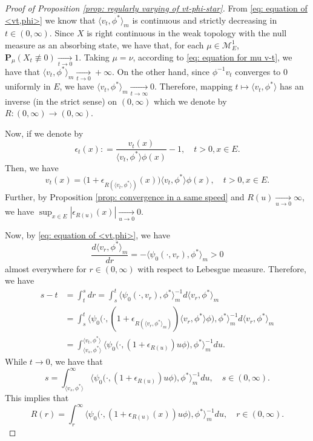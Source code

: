 \documentclass[12pt, a4paper]{amsart}
\theoremstyle{definition}
\numberwithin{equation}{section}
\begin{document}
\begin{proof}[Proof of Proposition \ref{prop: regularly varying of vt-phi-star}]
	
	From \eqref{eq: equation of <vt,phi>} we know that $\langle v_t,\phi^* \rangle_m$ is continuous and strictly decreasing in $t \in (0,\infty)$.
	Since $X$ is right continuous in the weak topology with the null measure as an absorbing state, we have that, for each $\mu \in \mathcal M_E^1$, $\mathbf P_\mu (X_t \not \equiv 0) \xrightarrow[t\to 0]{} 1$.
	Taking $\mu = \nu$, according to \eqref{eq: equation for mu v-t}, we have that $\langle v_{t}, \phi^*\rangle_m \xrightarrow[t\to 0]{} +\infty$.
	On the other hand, since $\phi^{-1}v_t$ converges to $0$ uniformly in $E$, we have $\langle v_{t}, \phi^*\rangle_m \xrightarrow[t\to \infty]{} 0$.
	Therefore, mapping $t\mapsto \langle v_t,\phi^*  \rangle$ has an inverse (in the strict sense) on $(0,\infty)$ which we denote by $R : (0,\infty) \to (0,\infty)$.
	
	Now, if we denote by
\[
	\epsilon_{t}(x)
	: = \frac{v_t(x)}{\langle v_t, \phi^*\rangle \phi(x)} - 1,
	\quad t>0, x\in E.
\]
	Then, we have
\[
	v_t(x)
	= \big(1+ \epsilon_{R(\langle v_t,\phi^* \rangle)}(x) \big )\langle v_t,\phi^* \rangle \phi(x),
	\quad t>0, x\in E.
\]
	Further, by Proposition \ref{prop: convergence in a same speed} and $R(u)\xrightarrow[u\to 0]{} \infty$, we have
$
	\sup_{x\in E}|\epsilon_{R(u)}(x)|
	\xrightarrow[u\to 0]{} 0.
$

	Now, by \eqref{eq: equation of <vt,phi>}, we have
\[
	\frac{d \langle v_r, \phi^* \rangle_m}{dr}
	= - \langle \psi_0(\cdot ,v_r) ,\phi^*\rangle_m
	> 0
\]
	almost everywhere for $r\in (0,\infty)$ with respect to Lebesgue measure.
	Therefore, we have
\[\begin{split}
	s-t
	& = \int_t^s dr
	= \int_s^t \langle \psi_0(\cdot ,v_r), \phi^*\rangle _m^{-1} d\langle v_r ,\phi^* \rangle_m
	\\&= \int_s^t \big\langle \psi_0\big( \cdot ,(1+ \epsilon_{R(\langle v_r,\phi^* \rangle_m)})\langle v_r,\phi^*\rangle \phi \big), \phi^* \big\rangle _m^{-1} d\langle v_r ,\phi^* \rangle_m
	\\&= \int_{\langle v_s,\phi^*\rangle}^{\langle v_t, \phi^* \rangle} \big\langle \psi_0 \big( \cdot ,( 1 + \epsilon_{R(u)} ) u \phi \big), \phi^* \big\rangle_m^{-1} du.
\end{split}\]
	While $t\to 0$, we have that
\[
	s
	= \int_{\langle v_s,\phi^*\rangle}^\infty \big\langle \psi_0 \big(\cdot ,( 1 + \epsilon_{R(u)} ) u \phi \big), \phi^* \big\rangle_m^{-1} du,
	\quad s\in (0,\infty).
\]
	This implies that
\[
	R(r)
	= \int_r^\infty \big\langle \psi_0 \big(\cdot ,( 1 + \epsilon_{R(u)}(x) ) u \phi \big), \phi^* \big\rangle_m^{-1} du,
	\quad r\in (0,\infty).
\]
	

\end{proof}
\end{document}
